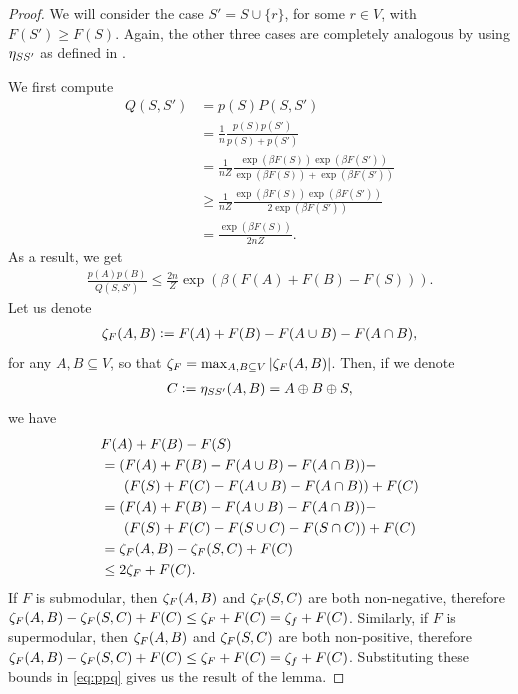 \begin{proof}
  We will consider the case $S' = S \cup \{r\}$, for some $r \in V$, with $F(S') \geq F(S)$.
  Again, the other three cases are completely analogous by using $\eta_{SS'}$ as defined in .
  
  We first compute
  \begin{align*}
    Q(S, S') &= p(S)P(S, S')\\
             &= \frac{1}{n}\frac{p(S)p(S')}{p(S) + p(S')} \tag*{by definition of the Gibbs sampler}\\
             &= \frac{1}{nZ}\frac{\exp(\beta F(S)) \exp(\beta F(S'))}{\exp(\beta F(S)) + \exp(\beta F(S'))} \tag*{by definition of our models}\\
             &\geq \frac{1}{nZ}\frac{\exp(\beta F(S)) \exp(\beta F(S'))}{2\exp(\beta F(S'))} \tag*{by $F(S') \geq F(S)$}\\
             &= \frac{\exp(\beta F(S))}{2nZ}.
  \end{align*}
  As a result, we get
  \begin{align} \label{eq:ppq}
    \frac{p(A)p(B)}{Q(S, S')} \leq \frac{2n}{Z}\exp(\beta (F(A) + F(B) - F(S))).
  \end{align}
  Let us denote
  \begin{align*}
    \zeta_F(A, B) \vcentcolon= F(A) + F(B) - F(A \cup B) - F(A \cap B),
  \end{align*}
  for any $A, B \subseteq V$, so that $\zeta_F = \max_{A, B \subseteq V}|\zeta_F(A, B)|$.
  Then, if we denote
  \begin{align*}
    C \vcentcolon= \eta_{SS'}(A, B) = A \oplus B \oplus S,
  \end{align*}
  we have
  \begin{align*}
    &F(A) + F(B) - F(S)\\
    &= (F(A) + F(B) - F(A \cup B) - F(A \cap B)) -\\
    &\ \ \ \ \ (F(S) + F(C) - F(A \cup B) - F(A \cap B)) + F(C)\\
    &= (F(A) + F(B) - F(A \cup B) - F(A \cap B)) -\\
    &\ \ \ \ \ (F(S) + F(C) - F(S \cup C) - F(S \cap C)) + F(C)\\
    &= \zeta_F(A, B) - \zeta_F(S, C) + F(C)\\
    &\leq 2\zeta_F + F(C).
  \end{align*}
  If $F$ is submodular, then $\zeta_F(A, B)$ and $\zeta_F(S, C)$ are both non-negative, therefore $\zeta_F(A, B) - \zeta_F(S, C) + F(C) \leq \zeta_F + F(C) = \zeta_f + F(C)$.
  Similarly, if $F$ is supermodular, then $\zeta_F(A, B)$ and $\zeta_F(S, C)$ are both non-positive, therefore $\zeta_F(A, B) - \zeta_F(S, C) + F(C) \leq \zeta_F + F(C) = \zeta_f + F(C)$.
  Substituting these bounds in \eqref{eq:ppq} gives us the result of the lemma.
\end{proof}
